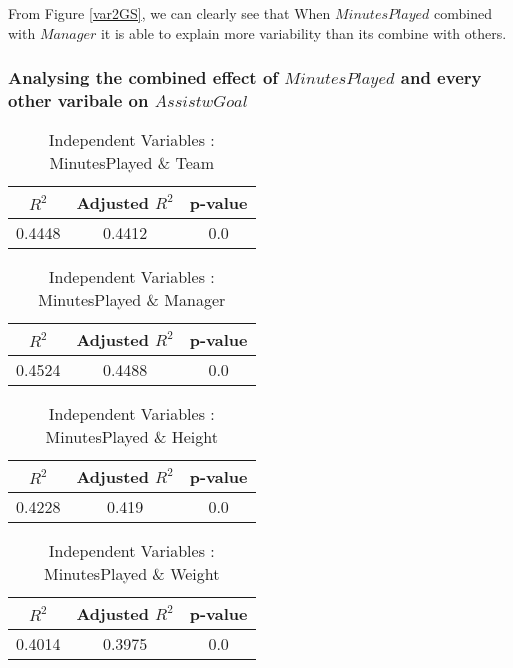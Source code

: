 \documentclass[12pt]{article}
\begin{document}
From Figure \ref{var2GS}, we can clearly see that When $ MinutesPlayed $ combined with $ Manager $ it is able to explain more variability than its combine with others.
\newpage
\subsubsection{Analysing the combined effect of $ MinutesPlayed $ and every other varibale on $ AssistwGoal $}
\begin{minipage}{0.4\textwidth}
	\begin{table}[H]
		\centering
		\caption{Independent Variables : MinutesPlayed \& Team}\label{table:1a}
		{\begin{tabular}{|c|c|c|}
				\hline
				$ R^2 $ & Adjusted $ R^2 $ & p-value \\
				\hline
				0.4448 & 0.4412 & 0.0 \\
				\hline
			\end{tabular}
		}
	\end{table}
\end{minipage}
\hfill
\begin{minipage}{0.4\textwidth}
	\begin{table}[H]
		\centering
		\caption{Independent Variables : MinutesPlayed \& Manager}\label{table:1a}
		{\begin{tabular}{|c|c|c|}
				\hline
				$ R^2 $ & Adjusted $ R^2 $ & p-value \\
				\hline
				0.4524 & 0.4488 & 0.0 \\
				\hline
			\end{tabular}
		}
	\end{table}
\end{minipage}
\hfill
\begin{minipage}{0.4\textwidth}
	\begin{table}[H]
		\centering
		\caption{Independent Variables : MinutesPlayed \& Height}\label{table:1a}
		{\begin{tabular}{|c|c|c|}
				\hline
				$ R^2 $ & Adjusted $ R^2 $ & p-value \\
				\hline
				0.4228 & 0.419 & 0.0 \\
				\hline
			\end{tabular}
		}
	\end{table}
\end{minipage}
\hfill
\begin{minipage}{0.4\textwidth}
	\begin{table}[H]
		\centering
		\caption{Independent Variables : MinutesPlayed \& Weight}\label{table:1a}
		{\begin{tabular}{|c|c|c|}
				\hline
				$ R^2 $ & Adjusted $ R^2 $ & p-value \\
				\hline
				0.4014 & 0.3975 & 0.0 \\
				\hline
			\end{tabular}
		}
	\end{table}
\end{minipage}
\end{document}
